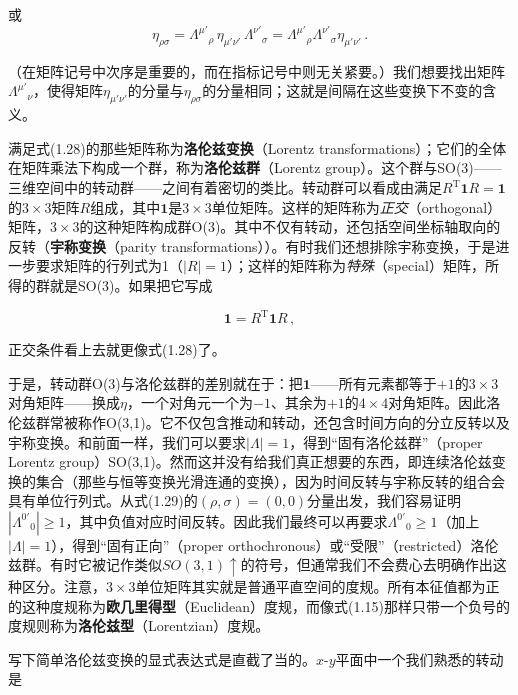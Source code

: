 或
\begin{equation*}
\eta_{\rho\sigma}=\Lambda^{\mu'}{}_{\rho}\,\eta_{\mu'\nu'}\,\Lambda^{\nu'}{}_{\sigma}
=\Lambda^{\mu'}{}_{\rho}\Lambda^{\nu'}{}_{\sigma}\eta_{\mu'\nu'}\,.
\tag{1.29}
\end{equation*}

（在矩阵记号中次序是重要的，而在指标记号中则无关紧要。）我们想要找出矩阵$\Lambda^{\mu'}{}_{\nu}$，使得矩阵$\eta_{\mu'\nu'}$的分量与$\eta_{\rho\sigma}$的分量相同；这就是间隔在这些变换下不变的含义。

满足式(1.28)的那些矩阵称为\textbf{洛伦兹变换}（Lorentz transformations）；它们的全体在矩阵乘法下构成一个群，称为\textbf{洛伦兹群}（Lorentz group）。这个群与SO(3)——三维空间中的转动群——之间有着密切的类比。转动群可以看成由满足$R^{\mathrm{T}}\mathbf{1}R=\mathbf{1}$的$3\times3$矩阵$R$组成，其中$\mathbf{1}$是$3\times3$单位矩阵。这样的矩阵称为\emph{正交}（orthogonal）矩阵，$3\times3$的这种矩阵构成群O(3)。其中不仅有转动，还包括空间坐标轴取向的反转（\textbf{宇称变换}（parity transformations））。有时我们还想排除宇称变换，于是进一步要求矩阵的行列式为1（$|R|=1$）；这样的矩阵称为\emph{特殊}（special）矩阵，所得的群就是SO(3)。如果把它写成

\begin{equation*}
\mathbf{1}=R^{\mathrm{T}}\mathbf{1}R\,,
\tag{1.30}
\end{equation*}

正交条件看上去就更像式(1.28)了。

于是，转动群O(3)与洛伦兹群的差别就在于：把$\mathbf{1}$——所有元素都等于$+1$的$3\times3$对角矩阵——换成$\eta$，一个对角元一个为$-1$、其余为$+1$的$4\times4$对角矩阵。因此洛伦兹群常被称作O(3,1)。它不仅包含推动和转动，还包含时间方向的分立反转以及宇称变换。和前面一样，我们可以要求$|\Lambda|=1$，得到“固有洛伦兹群”（proper Lorentz group）SO(3,1)。然而这并没有给我们真正想要的东西，即连续洛伦兹变换的集合（那些与恒等变换光滑连通的变换），因为时间反转与宇称反转的组合会具有单位行列式。从式(1.29)的$(\rho,\sigma)=(0,0)$分量出发，我们容易证明$|\Lambda^{0'}{}_{0}|\geq1$，其中负值对应时间反转。因此我们最终可以再要求$\Lambda^{0'}{}_{0}\geq1$（加上$|\Lambda|=1$），得到“固有正向”（proper orthochronous）或“受限”（restricted）洛伦兹群。有时它被记作类似$SO(3,1)\uparrow$的符号，但通常我们不会费心去明确作出这种区分。注意，$3\times3$单位矩阵其实就是普通平直空间的度规。所有本征值都为正的这种度规称为\textbf{欧几里得型}（Euclidean）度规，而像式(1.15)那样只带一个负号的度规则称为\textbf{洛伦兹型}（Lorentzian）度规。

写下简单洛伦兹变换的显式表达式是直截了当的。$x$-$y$平面中一个我们熟悉的转动是

